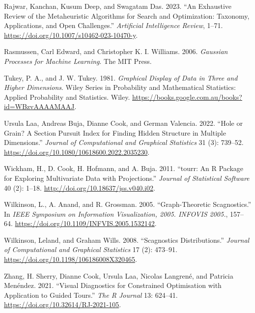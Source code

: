 \documentclass[
  12pt,
]{interact}
\newlength{\cslhangindent}
\newlength{\cslentryspacingunit} %
\newenvironment{CSLReferences}[2] %
 {%
  \setlength{\parindent}{0pt}
  \ifodd #1
  \let\oldpar\par
  \def\par{\hangindent=\cslhangindent\oldpar}
  \fi
  \setlength{\parskip}{#2\cslentryspacingunit}
 }%
 {}
\theoremstyle{plain}
\begin{document}
\begin{CSLReferences}{1}{0}
\leavevmode{}%
Rajwar, Kanchan, Kusum Deep, and Swagatam Das. 2023. {``An Exhaustive
Review of the Metaheuristic Algorithms for Search and Optimization:
Taxonomy, Applications, and Open Challenges.''} \emph{Artificial
Intelligence Review}, 1--71.
\url{https://doi.org/10.1007/s10462-023-10470-y}.

\leavevmode{}%
Rasmussen, Carl Edward, and Christopher K. I. Williams. 2006.
\emph{Gaussian Processes for Machine Learning}. The MIT Press.

\leavevmode{}%
Tukey, P. A., and J. W. Tukey. 1981. \emph{Graphical Display of Data in
Three and Higher Dimensions}. Wiley Series in Probability and
Mathematical Statistics: Applied Probability and Statistics. Wiley.
\url{https://books.google.com.au/books?id=WBzvAAAAMAAJ}.

\leavevmode{}%
Ursula Laa, Andreas Buja, Dianne Cook, and German Valencia. 2022.
{``Hole or Grain? A Section Pursuit Index for Finding Hidden Structure
in Multiple Dimensions.''} \emph{Journal of Computational and Graphical
Statistics} 31 (3): 739--52.
\url{https://doi.org/10.1080/10618600.2022.2035230}.

\leavevmode{}%
Wickham, H., D. Cook, H. Hofmann, and A. Buja. 2011. {``{tourr}: An {R}
Package for Exploring Multivariate Data with Projections.''}
\emph{Journal of Statistical Software} 40 (2): 1--18.
\url{http://doi.org/10.18637/jss.v040.i02}.

\leavevmode{}%
Wilkinson, L., A. Anand, and R. Grossman. 2005. {``Graph-Theoretic
Scagnostics.''} In \emph{IEEE Symposium on Information Visualization,
2005. INFOVIS 2005.}, 157--64.
\url{https://doi.org/10.1109/INFVIS.2005.1532142}.

\leavevmode{}%
Wilkinson, Leland, and Graham Wills. 2008. {``Scagnostics
Distributions.''} \emph{Journal of Computational and Graphical
Statistics} 17 (2): 473--91.
\url{https://doi.org/10.1198/106186008X320465}.

\leavevmode{}%
Zhang, H. Sherry, Dianne Cook, Ursula Laa, Nicolas Langrené, and
Patricia Menéndez. 2021. {``Visual Diagnostics for Constrained
Optimisation with Application to Guided Tours.''} \emph{The R Journal}
13: 624--41. \url{https://doi.org/10.32614/RJ-2021-105}.

\end{CSLReferences}
\end{document}
